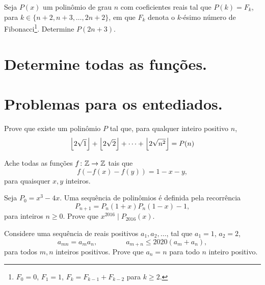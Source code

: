\documentclass[10pt,a4paper]{article}
\begin{document}
	\begin{prob}[$P(k) = F_k$, $P(2n+3) =\ ?$]\label{P(k)=F_k}
	Seja $P(x)$ um polinômio de grau $n$ com coeficientes reais tal que $P(k) = F_k$, para $k \in \{n+2, n+3, \dots, 2n+2\}$, em que $F_k$ denota o $k$-ésimo número de Fibonacci\footnote{$F_0 = 0$, $F_1 = 1$, $F_{k} = F_{k-1} + F_{k-2}$ para $k \ge 2$.}. Determine $P(2n+3)$.
	\end{prob}

	\newpage
	\section*{Determine todas as funções.}


	\section*{Problemas para os entediados.}

	\begin{prob}
		Prove que existe um polinômio $P$ tal que, para qualquer inteiro positivo $n$, \[
			\left \lfloor{2\sqrt{1}}\right \rfloor + \left \lfloor{2\sqrt{2}}\right \rfloor + \dots + \left \lfloor{2\sqrt{n^2}}\right \rfloor = P(n)
		\]
	\end{prob}


	\begin{prob}
		Ache todas as funções $f \colon \mathbb{Z} \to \mathbb{Z}$ tais que  \[ f( - f(x) - f(y) ) = 1 - x - y, \]para quaisquer $x, y$ inteiros.
	\end{prob}

	\begin{prob}
		Seja $P_0 = x^3 - 4x$. Uma sequência de polinômios é definida pela recorrência \[  P_{n+1} = P_n(1+x)P_n(1-x) - 1, \]
		para inteiros $n \ge 0$. Prove que $x^{2016} \mid P_{2016}(x)$.
	\end{prob}

	\begin{prob}
		Considere uma sequência de reais positivos $a_1, a_2, \dots$, tal que $a_1 = 1$, $a_2 = 2$,  \[
			a_{mn} = a_ma_n, \qquad \qquad a_{m+n} \le 2020(a_m + a_n),
		\]
			para todos $m, n$ inteiros positivos. Prove que $a_n = n$ para todo $n$ inteiro positivo.
	\end{prob}

\end{document}
